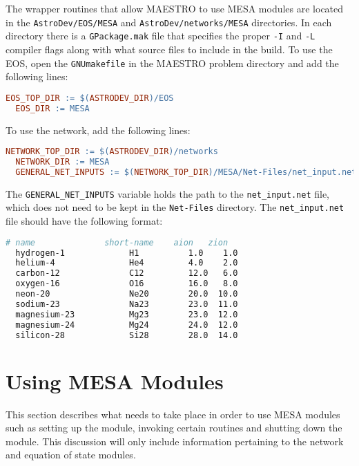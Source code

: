 The wrapper routines that allow {\sf MAESTRO} to use {\sf MESA} modules are 
located in the {\tt AstroDev/EOS/MESA} and {\tt AstroDev/networks/MESA} 
directories. In each directory there is a {\tt GPackage.mak} file that 
specifies the proper {\tt -I} and {\tt -L} compiler flags along with what 
source files to include in the build. To use the EOS, open the 
{\tt GNUmakefile} in the {\sf MAESTRO} problem directory and add the 
following lines:
\begin{lstlisting}[language=make,mathescape=false]
  EOS_TOP_DIR := $(ASTRODEV_DIR)/EOS
  EOS_DIR := MESA
\end{lstlisting}
To use the network, add the following lines:
\begin{lstlisting}[language=make,mathescape=false]
  NETWORK_TOP_DIR := $(ASTRODEV_DIR)/networks
  NETWORK_DIR := MESA
  GENERAL_NET_INPUTS := $(NETWORK_TOP_DIR)/MESA/Net-Files/net_input.net
\end{lstlisting}
The {\tt GENERAL\_NET\_INPUTS} variable holds the path to the
{\tt net\_input.net} file, which does not need to be kept in the
{\tt Net-Files} directory. The {\tt net\_input.net} file should have the 
following format:
\begin{lstlisting}[language=make,mathescape=false]
  # name              short-name    aion   zion
  hydrogen-1             H1          1.0    1.0
  helium-4               He4         4.0    2.0
  carbon-12              C12         12.0   6.0
  oxygen-16              O16         16.0   8.0
  neon-20                Ne20        20.0  10.0
  sodium-23              Na23        23.0  11.0
  magnesium-23           Mg23        23.0  12.0
  magnesium-24           Mg24        24.0  12.0
  silicon-28             Si28        28.0  14.0
\end{lstlisting}


\section{Using {\sf MESA} Modules}

This section describes what needs to take place in order to use 
{\sf MESA} modules such as setting up the module, invoking certain routines 
and shutting down the module. This discussion will only include information 
pertaining to the network and equation of state modules.

